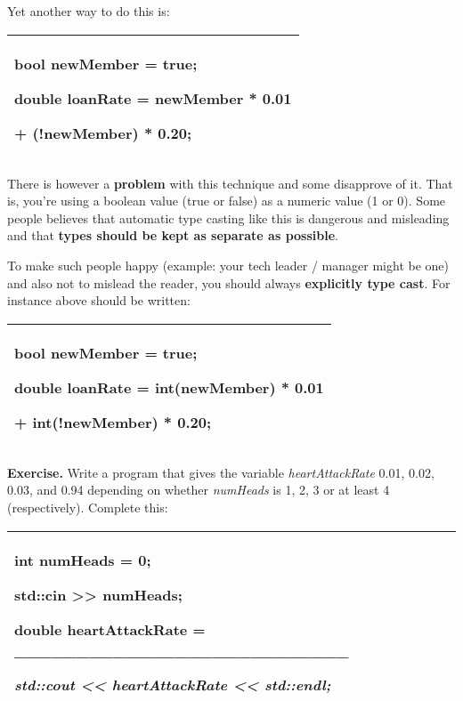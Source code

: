 \documentclass[
]{article}
\begin{document}
Yet another way to do this is:

\begin{longtable}[]{@{}l@{}}
\toprule
\endhead
\begin{minipage}[t]{0.97\columnwidth}\raggedright
bool newMember = true;

double loanRate = newMember * 0.01

+ (!newMember) * 0.20;\strut
\end{minipage}\tabularnewline
\bottomrule
\end{longtable}

There is however a \textbf{problem} with this technique and some
disapprove of it. That is, you're using a boolean value (true or false)
as a numeric value (1 or 0). Some people believes that automatic type
casting like this is dangerous and misleading and that \textbf{types
should be kept as separate as possible}.

To make such people happy (example: your tech leader / manager might be
one) and also not to mislead the reader, you should always
\textbf{explicitly type cast}. For instance above should be written:

\begin{longtable}[]{@{}l@{}}
\toprule
\endhead
\begin{minipage}[t]{0.97\columnwidth}\raggedright
bool newMember = true;

double loanRate = int(newMember) * 0.01

+ int(!newMember) * 0.20;\strut
\end{minipage}\tabularnewline
\bottomrule
\end{longtable}

\textbf{Exercise.} Write a program that gives the variable
\emph{heartAttackRate} 0.01, 0.02, 0.03, and 0.94 depending on whether
\emph{numHeads} is 1, 2, 3 or at least 4 (respectively). Complete this:

\begin{longtable}[]{@{}l@{}}
\toprule
\endhead
\begin{minipage}[t]{0.97\columnwidth}\raggedright
int numHeads = 0;

std::cin \textgreater\textgreater{} numHeads;

double heartAttackRate =
\_\_\_\_\_\_\_\_\_\_\_\_\_\_\_\_\_\_\_\_\_\_\_\_\_\_\_

\emph{std::cout \textless\textless{} heartAttackRate
\textless\textless{} std::endl;} \strut
\end{minipage}\tabularnewline
\bottomrule
\end{longtable}
\end{document}
